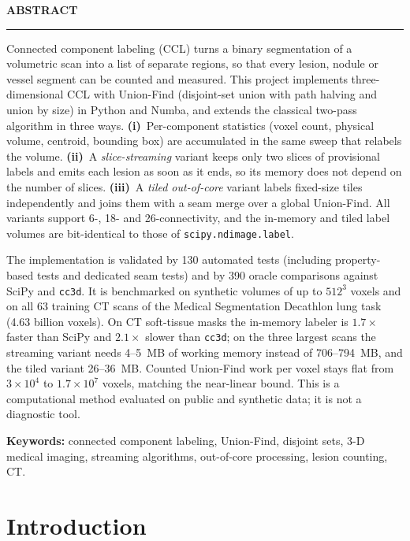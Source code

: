 \documentclass[11pt,a4paper]{article}
\newcommand{\FrontHeading}[1]{%
  \begin{center}{\LARGE\bfseries\color{sitred}#1}\\[-2pt]{\color{sitred}\rule{4.2cm}{0.8pt}}\end{center}\vspace{4pt}}
\begin{document}
{}
\FrontHeading{ABSTRACT}
Connected component labeling (CCL) turns a binary segmentation of a volumetric scan into a list of separate regions, so that every lesion, nodule or vessel segment can be counted and measured. This project implements three-dimensional CCL with Union-Find (disjoint-set union with path halving and union by size) in Python and Numba, and extends the classical two-pass algorithm in three ways. \textbf{(i)}~Per-component statistics (voxel count, physical volume, centroid, bounding box) are accumulated in the same sweep that relabels the volume. \textbf{(ii)}~A \emph{slice-streaming} variant keeps only two slices of provisional labels and emits each lesion as soon as it ends, so its memory does not depend on the number of slices. \textbf{(iii)}~A \emph{tiled out-of-core} variant labels fixed-size tiles independently and joins them with a seam merge over a global Union-Find. All variants support 6-, 18- and 26-connectivity, and the in-memory and tiled label volumes are bit-identical to those of \texttt{scipy.ndimage.label}.

The implementation is validated by 130 automated tests (including property-based tests and dedicated seam tests) and by 390 oracle comparisons against SciPy and \texttt{cc3d}. It is benchmarked on synthetic volumes of up to $512^3$ voxels and on all 63 training CT scans of the Medical Segmentation Decathlon lung task (4.63 billion voxels). On CT soft-tissue masks the in-memory labeler is $1.7\times$ faster than SciPy and $2.1\times$ slower than \texttt{cc3d}; on the three largest scans the streaming variant needs 4--5~MB of working memory instead of 706--794~MB, and the tiled variant 26--36~MB. Counted Union-Find work per voxel stays flat from $3\times10^{4}$ to $1.7\times10^{7}$ voxels, matching the near-linear bound. This is a computational method evaluated on public and synthetic data; it is not a diagnostic tool.

\medskip
\textbf{Keywords:} connected component labeling, Union-Find, disjoint sets, 3-D medical imaging, streaming algorithms, out-of-core processing, lesion counting, CT.
\clearpage

\section{Introduction}
\end{document}
